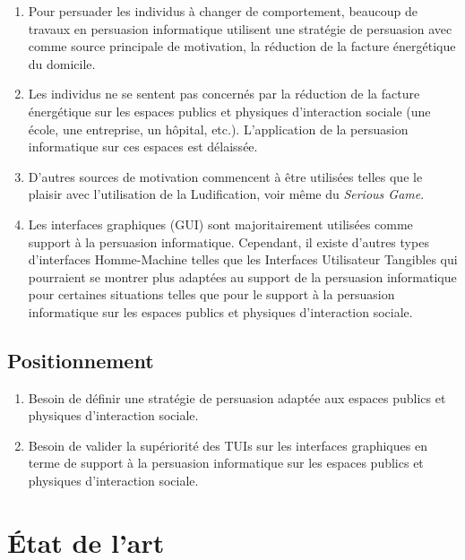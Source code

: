\documentclass[10pt,a5paper,twoside]{article}
\begin{document}
\begin{enumerate}
\def\labelenumi{\arabic{enumi}.}
\itemsep1pt\parskip0pt
\item
  Pour persuader les individus à changer de comportement, beaucoup de
  travaux en persuasion informatique utilisent une stratégie de
  persuasion avec comme source principale de motivation, la réduction de
  la facture énergétique du domicile.
\item
  Les individus ne se sentent pas concernés par la réduction de la
  facture énergétique sur les espaces publics et physiques d'interaction
  sociale (une école, une entreprise, un hôpital, etc.). L'application
  de la persuasion informatique sur ces espaces est délaissée.
\item
  D'autres sources de motivation commencent à être utilisées telles que
  le plaisir avec l'utilisation de la Ludification, voir même du
  \emph{Serious Game}.
\item
  Les interfaces graphiques (GUI) sont majoritairement utilisées comme
  support à la persuasion informatique. Cependant, il existe d'autres
  types d'interfaces Homme-Machine telles que les Interfaces Utilisateur
  Tangibles qui pourraient se montrer plus adaptées au support de la
  persuasion informatique pour certaines situations telles que pour le
  support à la persuasion informatique sur les espaces publics et
  physiques d'interaction sociale.
\end{enumerate}

\subsection{Positionnement}\label{positionnement}

\begin{enumerate}
\def\labelenumi{\arabic{enumi}.}
\itemsep1pt\parskip0pt
\item
  Besoin de définir une stratégie de persuasion adaptée aux espaces
  publics et physiques d'interaction sociale.
\item
  Besoin de valider la supériorité des TUIs sur les interfaces
  graphiques en terme de support à la persuasion informatique sur les
  espaces publics et physiques d'interaction sociale.
\end{enumerate}

\section{État de l'art}\label{uxe9tat-de-lart}
\end{document}
